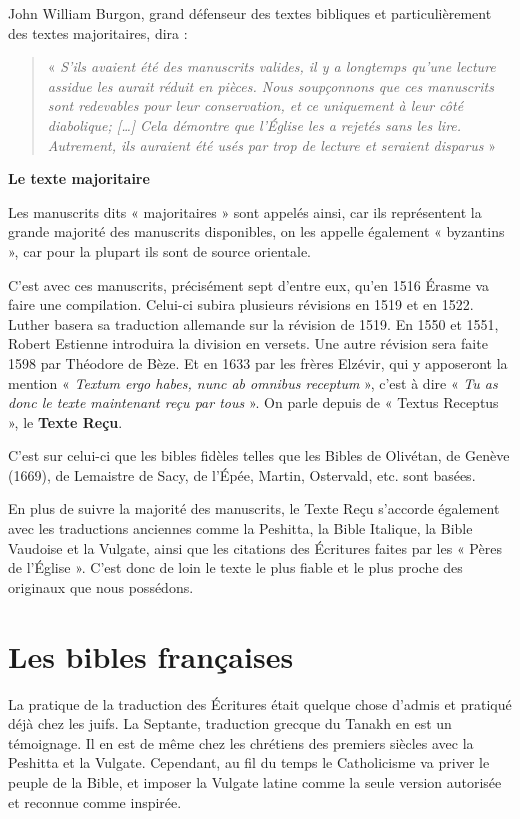 \begin{small}
John William Burgon, grand défenseur des textes bibliques et particulièrement des textes majoritaires, dira :
\begin{quote}
« \emph{S’ils avaient été des manuscrits valides, il y a longtemps qu’une lecture assidue les aurait réduit en pièces. Nous soupçonnons que ces manuscrits sont redevables pour leur conservation, et ce uniquement à leur côté diabolique; […] Cela démontre que l’Église les a rejetés sans les lire. Autrement, ils auraient été usés par trop de lecture et seraient disparus} »\newline
\end{quote}

\textbf{Le texte majoritaire}\bigskip

Les manuscrits dits « majoritaires » sont appelés ainsi, car ils représentent la grande majorité des manuscrits disponibles, on les appelle également « byzantins », car pour la plupart ils sont de source orientale.\bigskip

C'est avec ces manuscrits, précisément sept d'entre eux, qu'en 1516 Érasme va faire une compilation. Celui-ci subira plusieurs révisions en 1519 et en 1522. Luther basera sa traduction allemande sur la révision de 1519. En 1550 et 1551, Robert Estienne introduira la division en versets. Une autre révision sera faite 1598 par Théodore de Bèze. Et en 1633 par les frères Elzévir, qui y apposeront la mention « \emph{Textum ergo habes, nunc ab omnibus receptum} », c'est à dire « \emph{Tu as donc le texte maintenant reçu par tous} ». On parle depuis de « Textus Receptus », le \textbf{Texte Reçu}.\bigskip

C'est sur celui-ci que les bibles fidèles telles que les Bibles de Olivétan, de Genève (1669), de Lemaistre de Sacy, de l'Épée, Martin, Ostervald, etc. sont basées.\bigskip

En plus de suivre la majorité des manuscrits, le Texte Reçu s'accorde également avec les traductions anciennes comme la Peshitta, la Bible Italique, la Bible Vaudoise et la Vulgate, ainsi que les citations des Écritures faites par les « Pères de l'Église ». C'est donc de loin le texte le plus fiable et le plus proche des originaux que nous possédons.

\section*{Les bibles françaises}

La pratique de la traduction des Écritures était quelque chose d'admis et pratiqué déjà chez les juifs. La Septante, traduction grecque du Tanakh en est un témoignage. Il en est de même chez les chrétiens des premiers siècles avec la Peshitta et la Vulgate. Cependant, au fil du temps le Catholicisme va priver le peuple de la Bible, et imposer la Vulgate latine comme la seule version autorisée et reconnue comme inspirée.\bigskip


\end{small}
